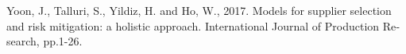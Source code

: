 \begin{thebibliography}{9}
\begin{latin}
	 Yoon, J., Talluri, S., Yildiz, H. and Ho, W., 2017. Models for supplier selection and risk mitigation: a holistic approach. International Journal of Production Research, pp.1-26.	
	
	
	




		
			

	
	
	
	

		
				
		
		
		
		
		
		
		
		
		
		
		
		
		
		
		
		
		
		
		
		
		
		
		
		
		
		
		
		
		
		
	
		
		
		
	\end{latin}

\end{thebibliography}
